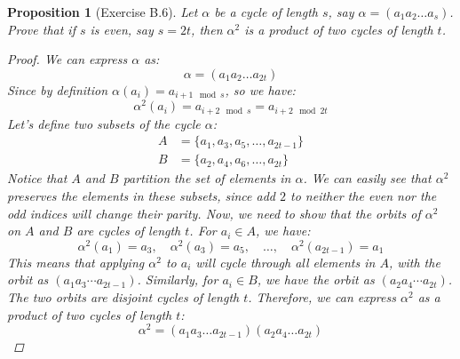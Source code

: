 \documentclass[12pt]{article}
\newtheorem{proposition}{Proposition}
\begin{document}
\begin{proposition}[Exercise B.6]
  Let $\alpha$ be a cycle of length $s$, say $\alpha = (a_1 a_2 \ldots a_s)$.
  Prove that if $s$ is even, say $s = 2t$, then $\alpha^2$ is a product of two cycles of length $t$.
  \begin{proof}
    We can express $\alpha$ as:
    \[
      \alpha = (a_1 a_2 \ldots a_{2t})
    \]
    Since by definition $\alpha(a_i) = a_{i + 1 \mod s}$, so we have:
    \[
      \alpha^2(a_i) = a_{i + 2 \mod s} = a_{i + 2 \mod 2t}
    \]
    Let's define two subsets of the cycle $\alpha$:
    \begin{align*}
      A & = \{a_1, a_3, a_5, \ldots, a_{2t - 1}\} \\
      B & = \{a_2, a_4, a_6, \ldots, a_{2t}\}
    \end{align*}
    Notice that $A$ and $B$ partition the set of elements in $\alpha$.
    We can easily see that $\alpha^2$ preserves the elements in these subsets, since add $2$
    to neither the even nor the odd indices will change their parity.
    Now, we need to show that the orbits of $\alpha^2$ on $A$ and $B$ are cycles of length $t$.
    For $a_i \in A$, we have:
    \[
      \alpha^2(a_1) = a_3, \quad \alpha^2(a_3) = a_5, \quad \ldots, \quad \alpha^2(a_{2t - 1}) = a_1
    \]
    This means that applying $\alpha^2$ to $a_i$ will cycle through all elements in $A$, with the orbit as $(a_1a_3\cdots a_{2t-1})$.
    Similarly, for $a_i \in B$, we have the orbit as $(a_2a_4\cdots a_{2t})$. The two orbits are disjoint cycles of length $t$.
    Therefore, we can express $\alpha^2$ as a product of two cycles of length $t$:
    \[
      \alpha^2 = (a_1 a_3 \ldots a_{2t - 1})(a_2 a_4 \ldots a_{2t})
    \]
  \end{proof}
\end{proposition}


\end{document}
